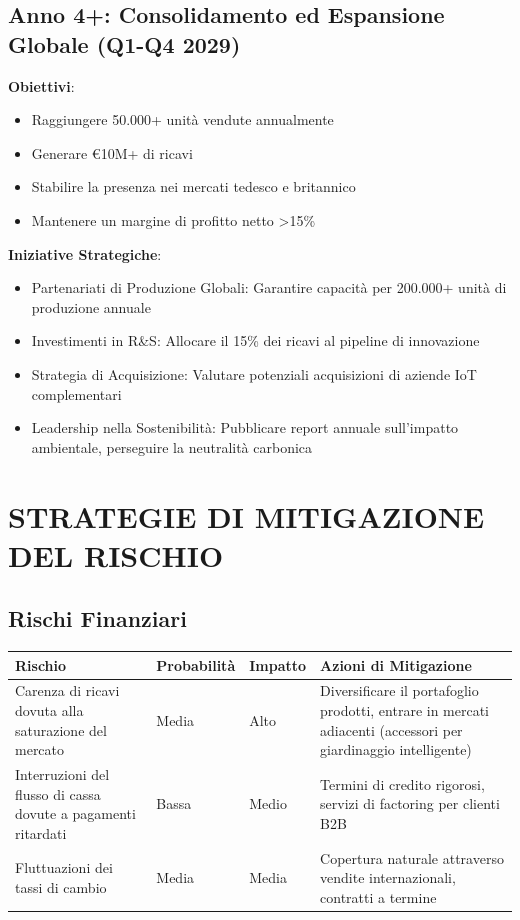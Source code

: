 \documentclass[11pt,a4paper]{report}
\begin{document}
\section{Anno 4+: Consolidamento ed Espansione Globale (Q1-Q4 2029)}
\textbf{Obiettivi}:
\begin{itemize}
    \item Raggiungere 50.000+ unità vendute annualmente
    \item Generare €10M+ di ricavi
    \item Stabilire la presenza nei mercati tedesco e britannico
    \item Mantenere un margine di profitto netto >15\%
\end{itemize}

\textbf{Iniziative Strategiche}:
\begin{itemize}
    \item Partenariati di Produzione Globali: Garantire capacità per 200.000+ unità di produzione annuale
    \item Investimenti in R\&S: Allocare il 15\% dei ricavi al pipeline di innovazione
    \item Strategia di Acquisizione: Valutare potenziali acquisizioni di aziende IoT complementari
    \item Leadership nella Sostenibilità: Pubblicare report annuale sull'impatto ambientale, perseguire la neutralità carbonica
\end{itemize}

\chapter{STRATEGIE DI MITIGAZIONE DEL RISCHIO}

\section{Rischi Finanziari}

\begin{longtable}{|p{3.5cm}|p{2cm}|p{2cm}|p{3.5cm}|}
\hline
\textbf{Rischio} & \textbf{Probabilità} & \textbf{Impatto} & \textbf{Azioni di Mitigazione} \\ \hline
Carenza di ricavi dovuta alla saturazione del mercato & Media & Alto & Diversificare il portafoglio prodotti, entrare in mercati adiacenti (accessori per giardinaggio intelligente) \\ \hline
Interruzioni del flusso di cassa dovute a pagamenti ritardati & Bassa & Medio & Termini di credito rigorosi, servizi di factoring per clienti B2B \\ \hline
Fluttuazioni dei tassi di cambio & Media & Media & Copertura naturale attraverso vendite internazionali, contratti a termine \\ \hline
\end{longtable}
\end{document}
